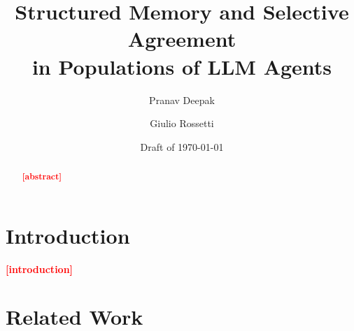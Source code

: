 \documentclass[11pt,a4paper]{article}
\title{Structured Memory and Selective Agreement\\in Populations of LLM Agents}
\author{Pranav Deepak \and Giulio Rossetti\\[0.5em]
  \small\pending{author order, affiliations, corresponding author}}
\date{Draft of \today}
\newcommand{\pending}[1]{\textcolor{red}{\textbf{[#1]}}}   %
\begin{document}
\maketitle

\begin{abstract}
\pending{abstract}
\end{abstract}

\section{Introduction}\label{sec:intro}
\pending{introduction}

\section{Related Work}\label{sec:related}
\end{document}

